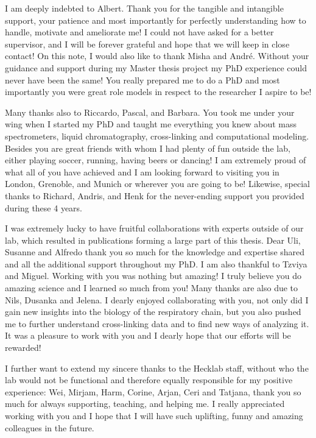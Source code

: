 I am deeply indebted to Albert. Thank you for the tangible and intangible support, your patience and most importantly for perfectly understanding how to handle, motivate and ameliorate me! I could not have asked for a better supervisor, and I will be forever grateful and hope that we will keep in close contact! On this note, I would also like to thank Misha and André. Without your guidance and support during my Master thesis project my PhD experience could never have been the same! You really prepared me to do a PhD and most importantly you were great role models in respect to the researcher I aspire to be!

Many thanks also to Riccardo, Pascal, and Barbara. You took me under your wing when I started my PhD and taught me everything you knew about mass spectrometers, liquid chromatography, cross-linking and computational modeling. Besides you are great friends with whom I had plenty of fun outside the lab, either playing soccer, running, having beers or dancing! I am extremely proud of what all of you have achieved and I am looking forward to visiting you in London, Grenoble, and Munich or wherever you are going to be! Likewise, special thanks to Richard, Andris, and Henk for the never-ending support you provided during these 4 years.

I was extremely lucky to have fruitful collaborations with experts outside of our lab, which resulted in publications forming a large part of this thesis. Dear Uli, Susanne and Alfredo thank you so much for the knowledge and expertise shared and all the additional support throughout my PhD. I am also thankful to Tzviya and Miguel. Working with you was nothing but amazing! I truly believe you do amazing science and I learned so much from you! Many thanks are also due to Nils, Dusanka and Jelena. I dearly enjoyed collaborating with you, not only did I gain new insights into the biology of the respiratory chain, but you also pushed me to further understand cross-linking data and to find new ways of analyzing it. It was a pleasure to work with you and I dearly hope that our efforts will be rewarded!

I further want to extend my sincere thanks to the Hecklab staff, without who the lab would not be functional and therefore equally responsible for my positive experience: Wei, Mirjam, Harm, Corine, Arjan, Ceri and Tatjana, thank you so much for always supporting, teaching, and helping me. I really appreciated working with you and I hope that I will have such uplifting, funny and amazing colleagues in the future.

